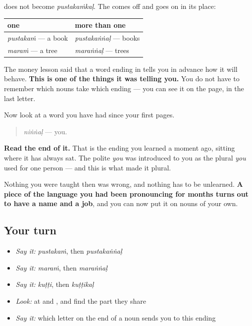 \begin{grammarlens}[title={Grammar Lens: a noun ending in \ml{ം} trades it away}]
\textbf{} does not become \emph{pustakaṁkaḷ}. The \textbf{} comes off and \textbf{} goes on in its place:

\noindent
\begin{tabularx}{\linewidth}{@{}>{\raggedright\arraybackslash}X>{\raggedright\arraybackslash}X@{}}
\toprule
\textbf{one} & \textbf{more than one} \\
\midrule
\textbf{\ml{പുസ്തകം}} \emph{pustakaṁ} — a book & \textbf{\ml{പുസ്തകങ്ങൾ}} \emph{pustakaṅṅaḷ} — books \\
\textbf{\ml{മരം}} \emph{maraṁ} — a tree & \textbf{\ml{മരങ്ങൾ}} \emph{maraṅṅaḷ} — trees \\
\bottomrule
\end{tabularx}

The money lesson said that a word ending in \textbf{} tells you in advance how it will behave. \textbf{This is one of the things it was telling you.} You do not have to remember which nouns take which ending — you can see it on the page, in the last letter.
\end{grammarlens}

\begin{grammarlens}[title={What you've built}]
Now look at a word you have had since your first pages.

\begin{quote}
\textbf{} \emph{niṅṅaḷ} — you.
\end{quote}

\textbf{Read the end of it.} That is the ending you learned a moment ago, sitting where it has always sat. The polite \emph{you} was introduced to you as the plural \emph{you} used for one person — and this is what made it plural.

Nothing you were taught then was wrong, and nothing has to be unlearned. \textbf{A piece of the language you had been pronouncing for months turns out to have a name and a job}, and you can now put it on nouns of your own.
\end{grammarlens}

\subsection*{Your turn}
\begin{itemize}
\raggedright
  \item \emph{Say it:} \emph{pustakaṁ}, then \emph{pustakaṅṅaḷ}
  \item \emph{Say it:} \emph{maraṁ}, then \emph{maraṅṅaḷ}
  \item \emph{Say it:} \emph{kuṭṭi}, then \emph{kuṭṭikaḷ}
  \item \emph{Look:} at \textbf{} and \textbf{}, and find the part they share
  \item \emph{Say it:} which letter on the end of a noun sends you to this ending
\end{itemize}

